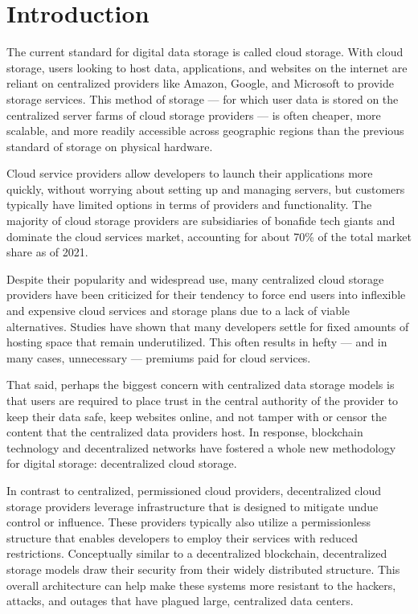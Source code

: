 \section{Introduction}

The current standard for digital data storage is called cloud storage. With cloud storage, users looking to host data, applications, and websites on the internet are reliant on centralized providers like Amazon, Google, and Microsoft to provide storage services. This method of storage — for which user data is stored on the centralized server farms of cloud storage providers — is often cheaper, more scalable, and more readily accessible across geographic regions than the previous standard of storage on physical hardware.

Cloud service providers allow developers to launch their applications more quickly, without worrying about setting up and managing servers, but customers typically have limited options in terms of providers and functionality. The majority of cloud storage providers are subsidiaries of bonafide tech giants and dominate the cloud services market, accounting for about 70\% of the total market share as of 2021.

Despite their popularity and widespread use, many centralized cloud storage providers have been criticized for their tendency to force end users into inflexible and expensive cloud services and storage plans due to a lack of viable alternatives. Studies have shown that many developers settle for fixed amounts of hosting space that remain underutilized. This often results in hefty — and in many cases, unnecessary — premiums paid for cloud services.

That said, perhaps the biggest concern with centralized data storage models is that users are required to place trust in the central authority of the provider to keep their data safe, keep websites online, and not tamper with or censor the content that the centralized data providers host. In response, blockchain technology and decentralized networks have fostered a whole new methodology for digital storage: decentralized cloud storage.

In contrast to centralized, permissioned cloud providers, decentralized cloud storage providers leverage infrastructure that is designed to mitigate undue control or influence. These providers typically also utilize a permissionless structure that enables developers to employ their services with reduced restrictions. Conceptually similar to a decentralized blockchain, decentralized storage models draw their security from their widely distributed structure. This overall architecture can help make these systems more resistant to the hackers, attacks, and outages that have plagued large, centralized data centers.